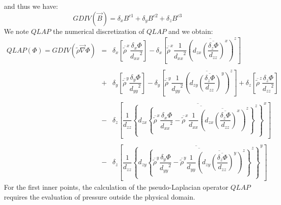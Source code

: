 and thus we have:
\begin{equation}
GDIV(\vec{B}) = \delta _x B^{c1} + \delta _y B^{c2} + \delta _z B^{c3}
\end{equation}
We note $QLAP$ the numerical discretization of $QLAP$ and we obtain:
\begin{eqnarray*}
QLAP (\Phi) = GDIV(\tilde{\rho} \vec{\nabla}  \Phi ) &  = &  \delta _{x}
\left[ \overline {\tilde{\rho} }^{x} \dfrac{\delta _{x} \Phi }{{d_{xx}}^2}
 \right]
  - \delta _{x} \left[
 \overline{\tilde{\rho} }^{x}
  \dfrac{1 }{{d_{xx}}^2} \overline{\left( d_{zx} \overline{\left(\dfrac
{\delta  _{z} \Phi }{d_{zz} }\right) }^{x}\right) }^{z}   \right]
  \nonumber \\ & & \nonumber \\
 & + &   \delta _{y} \left[ \overline{\tilde{\rho} }^{y}
 \dfrac{\delta _{y} \Phi }{{d_{yy}}^2}
 \right] - \delta _{y} \left[ \overline{\tilde\rho  }^{y}
  \dfrac{1 }{{d_{yy}}^2} \overline{\left( d_{zy} \overline{\left( \dfrac
{\delta  _{z} \Phi}{d_{zz} } \right) }^{y}\right) }^{z}   \right]
  +    \delta _{z} \left[ \overline{\tilde{\rho} }^{z}
 \dfrac{\delta _{z} \Phi }{{d_{zz}}^2} \right]  \nonumber \\ & & \nonumber \\
 & -  & \delta _{z} \left[
 \dfrac{1}{d_{zz}}
 \overline{
  \left\{ d_{zx}
 \overline{ \left\{ \overline{\tilde{\rho} }^{x}\dfrac{\delta _{x} \Phi }
{{d_{xx}}^2}
  -\overline{\tilde{\rho} }^{x}\dfrac{1 }{d_{xx}}
 \overline{ \left(  d_{zx} \overline{  \left( \dfrac{\delta
  _{z} \Phi}{d_{zz} }\right) }^{x}\right) }^{z}
\right\}  }^{z}
\right\}  }^{x}
 \right] \nonumber \\ & & \nonumber \\
& -  & \delta _{z} \left[
 \dfrac{1}{d_{zz}}
 \overline{
  \left\{ d_{zy}
\overline{\left\{\overline{\tilde{\rho}}^{y}\dfrac{\delta _{y}\Phi}{{d_{yy}}^2}
  -\overline{\tilde{\rho}}^{y}\dfrac{1 }{d_{yy}}
 \overline{ \left(  d_{zy} \overline{  \left( \dfrac{\delta
  _{z} \Phi}{d_{zz} }\right) }^{y}\right) }^{z}
\right\}  }^{z}
\right\}  }^{y}
 \right]
\end{eqnarray*}
For the first inner points, the calculation of the pseudo-Laplacian
operator $QLAP$ requires the evaluation of pressure outside the physical
domain. \\
